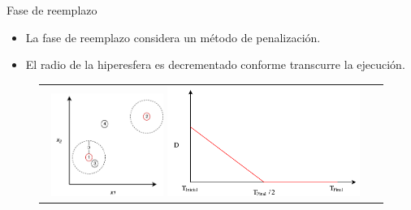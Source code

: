 \documentclass{beamer}
\begin{document}
\begin{frame}{Fase de reemplazo}
\begin{itemize}
\justifying
\item La fase de reemplazo considera un método de penalización.
\justifying
\item El radio de la hiperesfera es decrementado conforme transcurre la ejecución.
\end{itemize}
\begin{figure}
\centering
\begin{tabular}{cc}
\includegraphics[width=0.35\textwidth]{Metodo_Penalizacion.pdf} \quad \quad \quad
\includegraphics[width=0.6\textwidth]{Modelo.pdf}
\end{tabular}
\label{fig:DiversityProposal}
\end{figure}
\end{frame}
\end{document}
